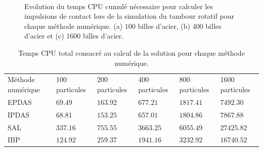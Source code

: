 \begin{figure}[h!]
\hspace{\fill}
\hspace{\fill}
   \\
\caption{\label{cumul_cpu_tambour}Evolution du temps CPU cumulé nécessaire pour calculer les impulsions de contact lors de la simulation du tambour rotatif pour chaque méthode numérique. (a) $100$ billes d'acier, (b) $400$ billes d'acier et (c) $1600$ billes d'acier.}
\end{figure}

\begin{table}[!h]
\begin{tabular}{|p{2cm}|p{1.75cm}|p{1.75cm}|p{1.75cm}|p{1.9cm}|p{1.9cm}|}
  \hline \rowcolor{lightgray}
  \multicolumn{6}{|c|}{Temps CPU total (s)} \\
  \hline \rowcolor{lightgray}
  Méthode numérique & 100 particules & 200 particules & 400 particules & 800 particules & 1600 particules \\ 
  \hline  EPDAS & $69.49$ & $163.92$ & $677.21$ & $1817.41$ & $7492.30$\\
  IPDAS & $68.81$ & $153.25$ & $657.01$ & $1804.86$ & $7867.88$\\
  SAL & $337.16$ & $755.55$ & $3663.25$ & $6055.49$ & $27425.82$\\
  IBP & $124.92$ & $259.37$ & $1941.16$ & $3232.92$ & $16740.52$\\ 
 \hline
\end{tabular}
 \caption{Temps CPU total consacré au calcul de la solution pour chaque méthode numérique.}\label{tab21}
\end{table}

